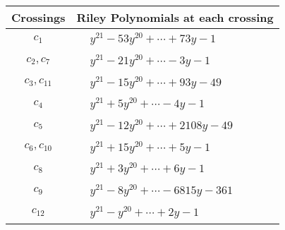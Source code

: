 \documentclass[1p]{elsarticle_modified}
\theoremstyle{definition}
\begin{document}
\begin{tabular}{m{50pt}|m{274pt}}
Crossings & \hspace{64pt}Riley Polynomials at each crossing \\
\hline $$\begin{aligned}c_{1}\end{aligned}$$&$\begin{aligned}
&y^{21}-53 y^{20}+\cdots+73 y-1
\end{aligned}$\\
\hline $$\begin{aligned}c_{2},c_{7}\end{aligned}$$&$\begin{aligned}
&y^{21}-21 y^{20}+\cdots-3 y-1
\end{aligned}$\\
\hline $$\begin{aligned}c_{3},c_{11}\end{aligned}$$&$\begin{aligned}
&y^{21}-15 y^{20}+\cdots+93 y-49
\end{aligned}$\\
\hline $$\begin{aligned}c_{4}\end{aligned}$$&$\begin{aligned}
&y^{21}+5 y^{20}+\cdots-4 y-1
\end{aligned}$\\
\hline $$\begin{aligned}c_{5}\end{aligned}$$&$\begin{aligned}
&y^{21}-12 y^{20}+\cdots+2108 y-49
\end{aligned}$\\
\hline $$\begin{aligned}c_{6},c_{10}\end{aligned}$$&$\begin{aligned}
&y^{21}+15 y^{20}+\cdots+5 y-1
\end{aligned}$\\
\hline $$\begin{aligned}c_{8}\end{aligned}$$&$\begin{aligned}
&y^{21}+3 y^{20}+\cdots+6 y-1
\end{aligned}$\\
\hline $$\begin{aligned}c_{9}\end{aligned}$$&$\begin{aligned}
&y^{21}-8 y^{20}+\cdots-6815 y-361
\end{aligned}$\\
\hline $$\begin{aligned}c_{12}\end{aligned}$$&$\begin{aligned}
&y^{21}- y^{20}+\cdots+2 y-1
\end{aligned}$\\
\hline
\end{tabular}\\~\\
\end{document}
